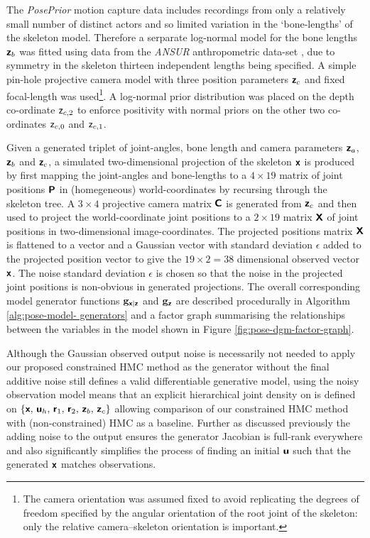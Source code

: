 The \emph{PosePrior} motion capture data includes recordings from only a relatively small number of distinct actors and so limited variation in the `bone-lengths' of the skeleton model. Therefore a serparate log-normal model for the bone lengths $\boldsymbol{\mathsf{z}}_b$ was fitted using data from the \emph{ANSUR} anthropometric data-set \citep{gordon1988ansur}, due to symmetry in the skeleton thirteen independent lengths being specified. A simple pin-hole projective camera model with three position parameters $\boldsymbol{\mathsf{z}}_c$ and fixed focal-length was used\footnote{The camera orientation was assumed fixed to avoid replicating the degrees of freedom specified by the angular orientation of the root joint of the skeleton: only the relative camera--skeleton orientation is important.}. A log-normal prior distribution was placed on the depth co-ordinate $\mathsf{z}_{c,2}$ to enforce positivity with normal priors on the other two co-ordinates $\mathsf{z}_{c,0}$ and $\mathsf{z}_{c,1}$. 

Given a generated triplet of joint-angles, bone length and camera parameters $\boldsymbol{\mathsf{z}}_a$, $\boldsymbol{\mathsf{z}}_b$ and $\boldsymbol{\mathsf{z}}_c$, a simulated two-dimensional projection of the skeleton $\boldsymbol{\mathsf{x}}$ is produced by first mapping the joint-angles and bone-lengths to a $4 \times 19$ matrix of joint positions $\boldsymbol{\mathsf{P}}$ in (homegeneous) world-coordinates by recursing through the skeleton tree. A $3 \times 4$ projective camera matrix $\boldsymbol{\mathsf{C}}$ is generated from $\boldsymbol{\mathsf{z}}_c$ and then used to project the world-coordinate joint positions to a $2 \times 19$ matrix $\boldsymbol{\mathsf{X}}$ of joint positions in two-dimensional image-coordinates. The projected positions matrix $\boldsymbol{\mathsf{X}}$ is flattened to a vector and a Gaussian vector with standard deviation $\epsilon$ added to the projected position vector to give the $19 \times 2 = 38$ dimensional observed vector $\boldsymbol{\mathsf{x}}$. The noise standard deviation $\epsilon$ is chosen so that the noise in the projected joint positions is non-obvious in generated projections. The overall corresponding model generator functions ${\mathbf{g}}_{\boldsymbol{\mathsf{x}}|\boldsymbol{\mathsf{z}}}$ and ${\mathbf{g}}_{\boldsymbol{\mathsf{z}}}$ are described procedurally in Algorithm \ref{alg:pose-model- generators} and a factor graph summarising the relationships between the variables in the model shown in Figure \ref{fig:pose-dgm-factor-graph}.

Although the Gaussian observed output noise is necessarily not needed to apply our proposed constrained \ac{HMC} method as the generator without the final additive noise still defines a valid differentiable generative model, using the noisy observation model means that an explicit hierarchical joint density on is defined on $\fset{\rvct{x},\,\rvct{u}_h,\,\rvct{r}_1,\,\rvct{r}_2,\,\rvct{z}_b,\,\rvct{z}_c}$ allowing comparison of our constrained \ac{HMC} method with (non-constrained) \ac{HMC} as a baseline. Further as discussed previously the adding noise to the output ensures the generator Jacobian is full-rank everywhere and also significantly simplifies the process of finding an initial $\boldsymbol{\mathsf{u}}$ such that the generated $\boldsymbol{\mathsf{x}}$ matches observations.


